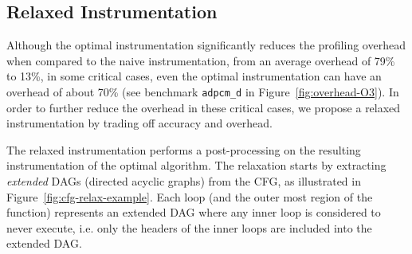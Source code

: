 \documentclass[sigplan,10pt]{acmart}
\begin{document}
\subsection{Relaxed Instrumentation}

Although the optimal instrumentation significantly reduces the profiling overhead when compared to the naive instrumentation, from an average overhead of 79\% to 13\%, in some critical cases, even the optimal instrumentation can have an overhead of about 70\% (see benchmark \texttt{adpcm\_d} in Figure~\ref{fig:overhead-O3}).
In order to further reduce the overhead in these critical cases, we propose a relaxed instrumentation by trading off accuracy and overhead.



The relaxed instrumentation performs a post-processing on the resulting instrumentation of the optimal algorithm.
The relaxation starts by extracting \textit{extended} DAGs (directed acyclic graphs) from the CFG, as illustrated in Figure~\ref{fig:cfg-relax-example}.
Each loop (and the outer most region of the function) represents an extended DAG where any inner loop is considered to never execute, i.e. only the headers of the inner loops are included into the extended DAG.

%
%
\end{document}
